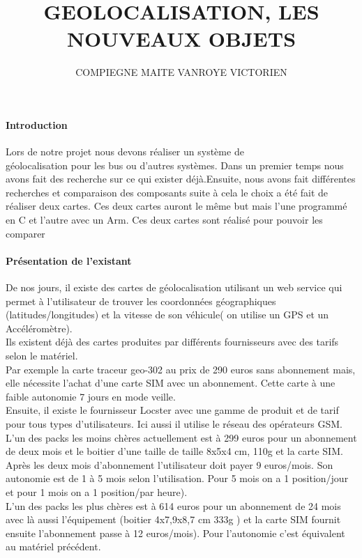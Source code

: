 \documentclass[10pt,a4paper]{article}
\author{COMPIEGNE MAITE VANROYE VICTORIEN}
\title{GEOLOCALISATION, LES NOUVEAUX OBJETS}
\begin{document}
\paragraph{Introduction}
Lors de notre projet nous devons réaliser un système de\\ géolocalisation pour les bus ou d'autres systèmes. Dans un premier temps nous avons fait des recherche sur ce qui exister déjà.Ensuite, nous avons fait différentes recherches et comparaison des composants suite à cela le choix a été fait de réaliser deux cartes. Ces deux cartes auront le même but mais l'une programmé en C et l'autre avec un Arm. Ces deux cartes sont réalisé pour pouvoir les comparer   
\paragraph{Présentation de l'existant}
De nos jours, il existe des cartes de géolocalisation utilisant un web service qui permet à l'utilisateur de trouver les coordonnées géographiques (latitudes/longitudes) et la vitesse de son véhicule( on utilise un GPS et un Accéléromètre).\\Ils existent déjà des cartes produites par différents fournisseurs avec des tarifs selon le matériel.\\Par exemple la carte traceur geo-302 au prix de 290 euros sans abonnement mais, elle nécessite l'achat d'une carte SIM avec un abonnement. Cette carte à une faible autonomie 7 jours en mode veille.\\Ensuite, il existe le fournisseur Locster avec une gamme de produit et de tarif pour tous types d'utilisateurs. Ici aussi il utilise le réseau des opérateurs GSM.\\L'un des packs les moins chères actuellement est à 299 euros pour un abonnement de deux mois et le boitier d'une taille de taille 8x5x4 cm, 110g et la carte SIM. Après les deux mois d'abonnement l'utilisateur doit payer 9 euros/mois. Son autonomie est de 1 à 5 mois selon l'utilisation. Pour 5 mois on a 1 position/jour et pour 1 mois on a 1 position/par heure).\\L'un des packs les plus chères est à 614 euros pour un abonnement de 24 mois avec là aussi l'équipement (boitier 4x7,9x8,7 cm 333g ) et la carte SIM fournit ensuite l'abonnement passe à 12 euros/mois). Pour l'autonomie c'est équivalent au matériel précédent. 
\end{document}
